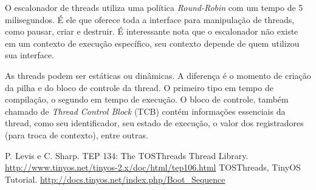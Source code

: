 \documentclass[a4paper,onecolumn, 10pt]{article}
\begin{document}
O escalonador de threads utiliza uma política \textit{Round-Robin} com um tempo de 5 milisegundos. É ele que oferece
toda a interface para manipulação de threads, como pausar, criar e destruir. É interessante nota que o escalonador não
existe em um contexto de execução específico, seu contexto depende de quem utilizou sua interface.

As threads podem ser estáticas ou dinâmicas. A diferença é o momento de criação da pilha e do bloco de controle da
thread. O primeiro tipo em tempo de compilação, o segundo em tempo de execução. O bloco de controle, também chamado de
\textit{Thread Control Block} (TCB) contém informações essenciais da thread, como seu identificador, seu estado de
execução, o valor dos registradores (para troca de contexto), entre outras.

\pagebreak

\begin{thebibliography}{9}
 P. Levis e C. Sharp. TEP 134: The TOSThreads Thread Library.
                    \url{http://www.tinyos.net/tinyos-2.x/doc/html/tep106.html}
 TOSThreads, TinyOS Tutorial. \url{http://docs.tinyos.net/index.php/Boot_Sequence}
\end{thebibliography}
\end{document}
